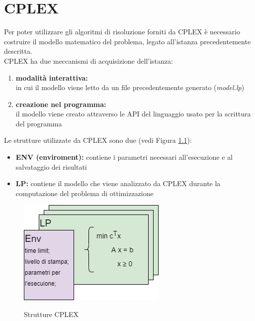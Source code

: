 \chapter{CPLEX}
Per poter utilizzare gli algoritmi di risoluzione forniti da CPLEX è necessario costruire il modello matematico del problema, legato all'istanza precedentemente descritta.\\
CPLEX ha due meccanismi di acquisizione dell'istanza:
\begin{enumerate}
\item{\textbf{modalità interattiva:}\\
in cui il modello viene letto da un file precedentemente generato (\textit{model.lp})}
\item{\textbf{creazione nel programma:}\\
il modello viene creato attraverso le API del linguaggio usato per la scrittura del programma}
\end{enumerate}

Le strutture utilizzate da CPLEX sono due (vedi Figura \ref{strutture_cplex}):
\begin{itemize}
\item{\textbf{ENV (enviroment):} contiene i parametri necessari all'esecuzione e al salvataggio dei risultati}
\item{\textbf{LP:} contiene il modello che viene analizzato da CPLEX durante la computazione del problema di ottimizzazione}
\end{itemize}

\begin{figure}[h] 
\begin{center} 
  \includegraphics[scale=0.7]{Images/cplex_structs}\\ 
  \caption{\footnotesize{Strutture CPLEX}}
  \label{strutture_cplex} 
\end{center} 
\end{figure}


